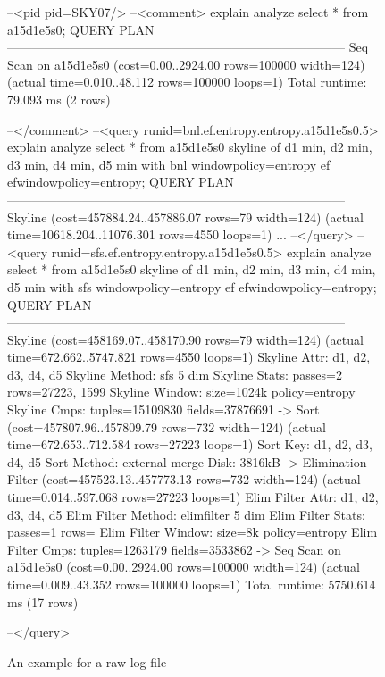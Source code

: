 \begin{figure}[htbp]
\begin{interactive}
--<pid pid=SKY07/>
--<comment>
explain analyze select * from a15d1e5s0;
                                    QUERY PLAN                                   
---------------------------------------------------------------------------------
 Seq Scan on a15d1e5s0  (cost=0.00..2924.00 rows=100000 width=124) \prebreak
   \postbreak (actual time=0.010..48.112 rows=100000 loops=1)
 Total runtime: 79.093 ms
(2 rows)

--</comment>
--<query runid=bnl.ef.entropy.entropy.a15d1e5s0.5>
explain analyze select * from a15d1e5s0 \prebreak
  \postbreak skyline of d1 min, d2 min, d3 min, d4 min, d5 min
  \postbreak with bnl windowpolicy=entropy ef efwindowpolicy=entropy;
                                    QUERY PLAN                                   
---------------------------------------------------------------------------------
 Skyline  (cost=457884.24..457886.07 rows=79 width=124) \prebreak
   \postbreak (actual time=10618.204..11076.301 rows=4550 loops=1)
... 
--</query>
--<query runid=sfs.ef.entropy.entropy.a15d1e5s0.5>
explain analyze select * from a15d1e5s0 \prebreak
  \postbreak skyline of d1 min, d2 min, d3 min, d4 min, d5 min \prebreak
  \postbreak with sfs windowpolicy=entropy ef efwindowpolicy=entropy;
                                    QUERY PLAN
---------------------------------------------------------------------------------
 Skyline  (cost=458169.07..458170.90 rows=79 width=124) \prebreak
   \postbreak (actual time=672.662..5747.821 rows=4550 loops=1)
   Skyline Attr: d1, d2, d3, d4, d5
   Skyline Method: sfs 5 dim
   Skyline Stats: passes=2 rows=27223, 1599
   Skyline Window: size=1024k policy=entropy
   Skyline Cmps: tuples=15109830 fields=37876691
   ->  Sort  (cost=457807.96..457809.79 rows=732 width=124) \prebreak
         \postbreak (actual time=672.653..712.584 rows=27223 loops=1)
         Sort Key: d1, d2, d3, d4, d5
         Sort Method:  external merge  Disk: 3816kB
         ->  Elimination Filter  (cost=457523.13..457773.13 rows=732 width=124) \prebreak
               \postbreak (actual time=0.014..597.068 rows=27223 loops=1)
               Elim Filter Attr: d1, d2, d3, d4, d5
               Elim Filter Method: elimfilter 5 dim
               Elim Filter Stats: passes=1 rows=
               Elim Filter Window: size=8k policy=entropy
               Elim Filter Cmps: tuples=1263179 fields=3533862
               ->  Seq Scan on a15d1e5s0  (cost=0.00..2924.00 rows=100000 \prebreak
                     \postbreak width=124) (actual time=0.009..43.352 rows=100000 loops=1)
 Total runtime: 5750.614 ms
(17 rows)

--</query>
\end{interactive}
\caption{An example for a raw log file}
\label{fig:logfile}
\end{figure}

